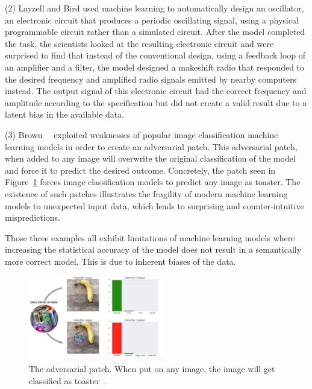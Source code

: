 \par \noindent (2)
Layzell and Bird \cite{Bird:2002:ERI:1251972.1252349} used machine learning to automatically design an oscillator, an electronic circuit that produces a periodic oscillating signal, using a physical programmable circuit rather than a simulated circuit. After the model completed the task, the scientists looked at the resulting electronic circuit and were surprised to find that instead of the conventional design, using a feedback loop of an amplifier and a filter, the model designed a makeshift radio that responded to the desired frequency and amplified radio signals emitted by nearby computers instead. The output signal of this electronic circuit had the correct frequency and amplitude according to the specification but did not create a valid result due to a latent bias in the available data.


\par \noindent (3)
Brown~\etal~\cite{2017arXiv171209665B} exploited weaknesses of popular image classification machine learning models in order to create an adversarial patch.
This adversarial patch, when added to any image will overwrite the original classification of the model and force it to predict the desired outcome.
Concretely, the patch seen in Figure~\ref{figs:toaster} forces image classification models to predict any image as toaster.
The existence of such patches illustrates the fragility of modern machine learning models to unexpected input data, which leads to surprising and counter-intuitive mispredictions.

Those three examples all exhibit limitations of machine learning models where increasing the statistical accuracy of the model does not result in a semantically more correct model.
This is due to inherent biases of the data.

\begin{figure}
\centering
\includegraphics[height=10em]{tex/introduction/adversarialtoaster.png}
\caption[The adversarial patch.]{
The adversarial patch. When put on any image, the image will get classified as toaster~\cite{2017arXiv171209665B}.
}
\label{figs:toaster}
\end{figure}

